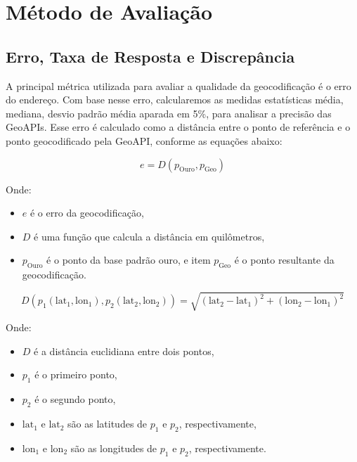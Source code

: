 \section{Método de Avaliação}
\label{metricasErro}

\subsection{Erro, Taxa de Resposta e Discrepância}

A principal métrica utilizada para avaliar a qualidade da geocodificação é o erro do endereço. Com base nesse erro, calcularemos as medidas estatísticas média, mediana, desvio padrão média aparada em 5\%, para analisar a precisão das GeoAPIs. Esse erro é calculado como a distância entre o ponto de referência e o ponto geocodificado pela GeoAPI, conforme as equações abaixo:

\begin{equation}
e = D(p_{\text{Ouro}}, p_{\text{Geo}})
\end{equation}

Onde:
\begin{itemize}
\item $e$ é o erro da geocodificação,
\item $D$ é uma função que calcula a distância em quilômetros,
\item $p_{\text{Ouro}}$ é o ponto da base padrão ouro, e
item $p_{\text{Geo}}$ é o ponto resultante da geocodificação.
\end{itemize}

\begin{equation}
D( p_1(\text{lat}_1, \text{lon}_1), p_2(\text{lat}_2, \text{lon}_2) ) = \sqrt{{(\text{lat}_2 - \text{lat}_1)^2 + (\text{lon}_2 - \text{lon}_1)^2}}
\label{eq:distEuclidian}
\end{equation}

Onde:
\begin{itemize}
    \item $D$ é a distância euclidiana entre dois pontos,
    \item $p_1$ é o primeiro ponto,
    \item $p_2$ é o segundo ponto,
    \item $\text{lat}_1$ e $\text{lat}_2$ são as latitudes de $p_1$ e $p_2$, respectivamente,
    \item $\text{lon}_1$ e $\text{lon}_2$ são as longitudes de $p_1$ e $p_2$, respectivamente.
\end{itemize}


